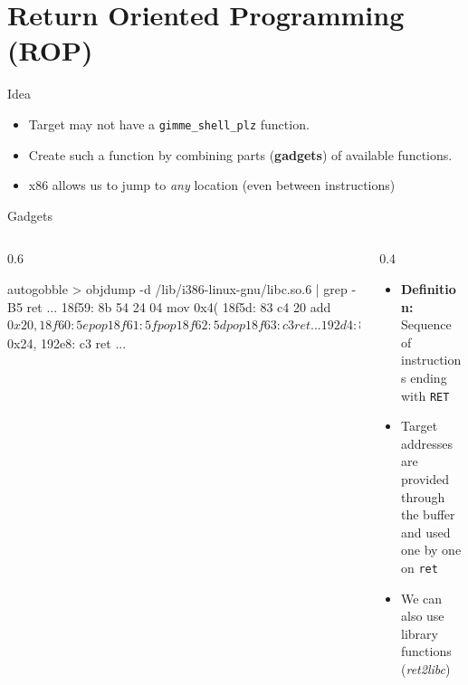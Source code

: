 \documentclass[beamer]{uibk}
\begin{document}
\section{Return Oriented Programming (ROP)}

\begin{frame}{Idea}
    \begin{itemize}
        \item Target may not have a \texttt{gimme\_shell\_plz} function.
        \bigskip
        \pause
        \item Create such a function by combining parts (\textbf{gadgets}) of
            available functions.
        \bigskip
        \item x86 allows us to jump to \emph{any} location (even between
            instructions)
    \end{itemize}
\end{frame}

\begin{frame}[fragile]{Gadgets}
    \begin{columns}
        \begin{column}{0.6\textwidth}
            \begin{pre*}{autogobble}
                > objdump -d /lib/i386-linux-gnu/libc.so.6 | grep -B5 ret
                  ...
                18f59:       8b 54 24 04             mov    0x4(%
                18f5d:       83 c4 20                add    $0x20,%
                18f60:       5e                      pop    %
                18f61:       5f                      pop    %
                18f62:       5d                      pop    %
                18f63:       c3                      ret
                  ...
                192d4:       8b 54 24 2c             mov    0x2c(%
                192d8:       e8 23 fc ff ff          call   18f00 <__floatdidf+0x30>
                192dd:       8b 44 24 18             mov    0x18(%
                192e1:       8b 54 24 1c             mov    0x1c(%
                192e5:       83 c4 24                add    $0x24,%
                192e8:       c3                      ret
                  ...
            \end{pre*}
        \end{column}
        \begin{column}{0.4\textwidth}
            \begin{itemize}
                \item \textbf{Definition:} Sequence of instructions ending with
                    \texttt{RET}
                \bigskip
                \item Target addresses are provided through the buffer and used
                    one by one on \texttt{ret}
                \bigskip
                \item We can also use library functions (\textit{ret2libc})
            \end{itemize}
        \end{column}
    \end{columns}
\end{frame}
\end{document}
